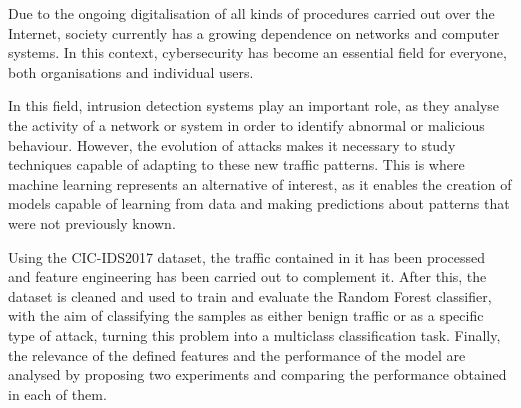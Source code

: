 Due to the ongoing digitalisation of all kinds of procedures carried out over the Internet, society currently has a growing dependence on networks and computer systems. In this context, cybersecurity has become an essential field for everyone, both organisations and individual users.

In this field, intrusion detection systems play an important role, as they analyse the activity of a network or system in order to identify abnormal or malicious behaviour. However, the evolution of attacks makes it necessary to study techniques capable of adapting to these new traffic patterns. This is where machine learning represents an alternative of interest, as it enables the creation of models capable of learning from data and making predictions about patterns that were not previously known.

Using the CIC-IDS2017 dataset, the traffic contained in it has been processed and feature engineering has been carried out to complement it. After this, the dataset is cleaned and used to train and evaluate the Random Forest classifier, with the aim of classifying the samples as either benign traffic or as a specific type of attack, turning this problem into a multiclass classification task. Finally, the relevance of the defined features and the performance of the model are analysed by proposing two experiments and comparing the performance obtained in each of them.

